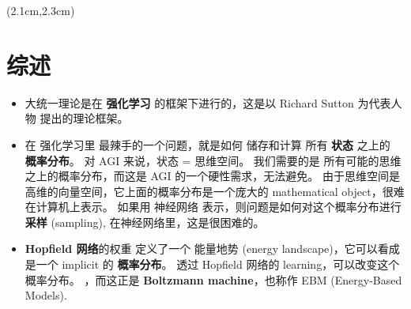\begin{preview}

\cc{
\title{\vspace{-1.5cm} \bfseries\color{blue}{\LARGE AGI 大统一理论}}
}{
\title{\vspace{-1.5cm} \bfseries\color{blue}{\LARGE AGI Grand Unification}}
}

\date{\vspace{-2cm}} %

\maketitle

\setcounter{section}{-1}

\begin{textblock*}{5cm}(2.1cm,2.3cm) %
{}
\end{textblock*}

\begin{minipage}{\textwidth}
\setlength{\parskip}{0.4\baselineskip}

\section{综述}

\begin{itemize}

	\item 大统一理论是在 \textbf{强化学习} 的框架下进行的，这是以 Richard Sutton 为代表人物 提出的理论框架。 

	\item 在 强化学习里 最辣手的一个问题，就是如何 储存和计算 所有 \textbf{状态} 之上的 \textbf{概率分布}。 对 AGI 来说，状态 = 思维空间。 我们需要的是 所有可能的思维之上的概率分布，而这是 AGI 的一个硬性需求，无法避免。 由于思维空间是高维的向量空间，它上面的概率分布是一个庞大的 mathematical object，很难在计算机上表示。 如果用 神经网络 表示，则问题是如何对这个概率分布进行 \textbf{采样} (sampling), 在神经网络里，这是很困难的。

	\item \textbf{Hopfield 网络}的权重 定义了一个 能量地势 (energy landscape)，它可以看成是一个 implicit 的 \textbf{概率分布}。 透过 Hopfield 网络的 learning，可以改变这个概率分布。 ，而这正是 \textbf{Boltzmann machine}，也称作 EBM (Energy-Based Models).


\end{itemize}
\end{minipage}
\end{preview}
